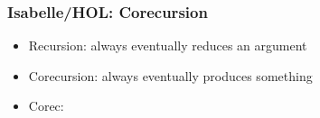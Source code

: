 \documentclass[aspectratio=169,10pt]{beamer}
\begin{document}
\begin{frame}[fragile]
  \frametitle{Isabelle/HOL: Corecursion}
  \begin{itemize}
    \item Recursion: always eventually reduces an argument
    \item Corecursion: always eventually produces something
          \pause
    \item Corec:

  \end{itemize}
\end{frame}
\end{document}

